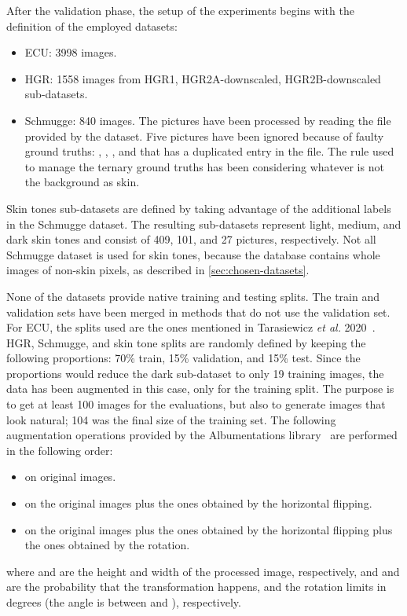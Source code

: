 After the validation phase, the setup of the experiments begins with the definition of the employed datasets:
\begin{itemize}
    \item ECU: 3998 images.
    \item HGR: 1558 images from HGR1, HGR2A-downscaled, HGR2B-downscaled sub-datasets.
    \item Schmugge: 840 images.
    The pictures have been processed by reading the  file provided by the dataset.
    Five pictures have been ignored because of faulty ground truths: , , , and  that has a duplicated entry in the file.
    The rule used to manage the ternary ground truths has been considering whatever is not the background as skin.
\end{itemize}

\noindent Skin tones sub-datasets are defined by taking advantage of the additional labels in the Schmugge dataset.
The resulting sub-datasets represent light, medium, and dark skin tones and consist of 409, 101, and 27 pictures, respectively.
Not all Schmugge dataset is used for skin tones, because the database contains whole images of non-skin pixels, as described in \autoref{sec:chosen-datasets}.

None of the datasets provide native training and testing splits.
The train and validation sets have been merged in methods that do not use the validation set.
For ECU, the splits used are the ones mentioned in Tarasiewicz \textit{et al.} 2020~\cite{tarasiewicz2020skinny}.
HGR, Schmugge, and skin tone splits are randomly defined by keeping the following proportions: 70\% train, 15\% validation, and 15\% test.
Since the proportions would reduce the dark sub-dataset to only 19 training images, the data has been augmented in this case, only for the training split.
The purpose is to get at least 100 images for the evaluations, but also to generate images that look natural; 104 was the final size of the training set.
The following augmentation operations provided by the Albumentations library~\cite{buslaev2020albumentations} are performed in the following order:
\begin{itemize}
\itemsep0em
    \item {} on original images.
    \item {} on the original images plus the ones obtained by the horizontal flipping.
    \item {} on the original images plus the ones obtained by the horizontal flipping plus the ones obtained by the rotation.
\end{itemize}
where  and  are the height and width of the processed image, respectively, and  and  are the probability that the transformation happens, and the rotation limits in degrees (the angle is between  and ), respectively.


